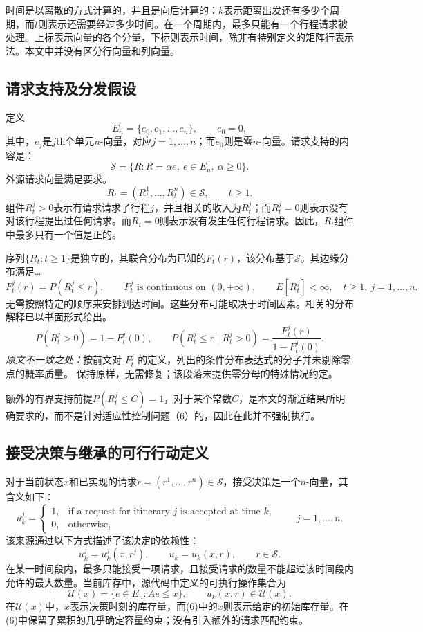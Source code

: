 \documentclass{article}
\begin{document}
时间是以离散的方式计算的，并且是向后计算的：$k$表示距离出发还有多少个周期，而$t$则表示还需要经过多少时间。在一个周期内，最多只能有一个行程请求被处理。上标表示向量的各个分量，下标则表示时间，除非有特别定义的矩阵行表示法。本文中并没有区分行向量和列向量。

\subsection*{请求支持及分发假设}
定义
\[
E_n=\{e_0,e_1,\ldots,e_n\},
\qquad e_0=0,
\]
其中，$e_j$是$j$th个单元$n$-向量，对应$j=1,\ldots,n$；而$e_0$则是零$n$-向量。请求支持的内容是：
\[
\mathcal{S}=\{R:R=\alpha e,\ e\in E_n,\ \alpha\geq0\}.
\]
外源请求向量满足要求。
\[
R_t=(R_t^1,\ldots,R_t^n)\in\mathcal{S},\qquad t\geq1.
\]
组件$R_t^j>0$表示有请求请求了行程$j$，并且相关的收入为$R_t^j$；而$R_t^j=0$则表示没有对该行程提出过任何请求。而$R_t=0$则表示没有发生任何行程请求。因此，$R_t$组件中最多只有一个值是正的。

序列$\{R_t;t\geq1\}$是独立的，其联合分布为已知的$F_t(r)$，该分布基于$\mathcal{S}$。其边缘分布满足…
\[
F_t^j(r)=P(R_t^j\leq r),\qquad
F_t^j\text{ is continuous on }(0,+\infty),\qquad
E[R_t^j]<\infty,
\quad t\geq1,\ j=1,\ldots,n.
\]
无需按照特定的顺序来安排到达时间。这些分布可能取决于时间因素。相关的分布解释已以书面形式给出。
\[
P(R_t^j>0)=1-F_t^j(0),
\qquad
P(R_t^j\leq r\mid R_t^j>0)
=\frac{F_t^j(r)}{1-F_t^j(0)}.
\]
\emph{原文不一致之处：}按前文对 $F_t^j$ 的定义，列出的条件分布表达式的分子并未剔除零点的概率质量。 保持原样，无需修复；该段落未提供零分母的特殊情况约定。

额外的有界支持前提$P(R_t^j\leq C)=1$，对于某个常数$C$，是本文的渐近结果所明确要求的，而不是针对适应性控制问题（6）的，因此在此并不强制执行。

\subsection*{接受决策与继承的可行行动定义}
对于当前状态$x$和已实现的请求$r=(r^1,\ldots,r^n)\in\mathcal{S}$，接受决策是一个$n$-向量，其含义如下：
\[
u_k^j=\begin{cases}
1,&\text{if a request for itinerary }j\text{ is accepted at time }k,\\
0,&\text{otherwise},
\end{cases}
\qquad j=1,\ldots,n.
\]
该来源通过以下方式描述了该决定的依赖性：
\[
u_k^j=u_k^j(x,r^j),\qquad
u_k=u_k(x,r),\qquad r\in\mathcal{S}.
\]
在某一时间段内，最多只能接受一项请求，且接受请求的数量不能超过该时间段内允许的最大数量。当前库存中，源代码中定义的可执行操作集合为
\[
\mathcal{U}(x)=\{e\in E_n:Ae\leq x\},
\qquad u_k(x,r)\in\mathcal{U}(x).
\]
在$\mathcal{U}(x)$中，$x$表示决策时刻的库存量，而(6)中的$x$则表示给定的初始库存量。在(6)中保留了累积的几乎确定容量约束；没有引入额外的请求匹配约束。
\end{document}
